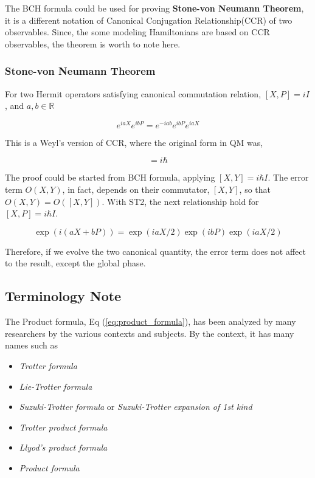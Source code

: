 The BCH formula could be used for proving \textbf{Stone-von Neumann Theorem},
it is a different notation of Canonical Conjugation Relationship(CCR) of two observables.
Since, the some modeling Hamiltonians are based on CCR observables,
the theorem is worth to note here.

\subsubsection{Stone-von Neumann Theorem}

\begin{theorem}  %
    For two Hermit operators satisfying canonical commutation relation, 
    $[X, P] = i I$,
    and $a, b \in \mathbb{R}$
    
    \begin{equation}
        e^{i a X} e^{i b P} = e^{- i ab} e^{i bP} e^{iaX}
    \end{equation}
\end{theorem}

This is a Weyl's version of CCR, where the original form in QM was,

\begin{equation}
    [x, p] = i \hbar
\end{equation}

The proof could be started from BCH formula, applying $[X, Y] = i \hbar I$.
The error term $O(X, Y)$, in fact, depends on their commutator, $[X, Y]$, 
so that $O(X, Y) = O([X, Y])$\cite{PhysRevX.11.011020}. 
With ST2, the next relationship hold for $[X, P] = i\hbar I$.

\begin{equation}
    \exp(i (a X + b P)) = \exp(i a X/2) \exp(i b P) \exp(i a X/2)
\end{equation}

Therefore, if we evolve the two canonical quantity,
the error term does not affect to the result, except the global phase.

\subsection{Terminology Note}

The Product formula, Eq (\ref{eq:product_formula}), has been analyzed by many researchers by the various contexts and subjects.
By the context, it has many names such as

\begin{itemize}
    \item \textit{Trotter formula}
    \item \textit{Lie-Trotter formula}
    \item \textit{Suzuki-Trotter formula} or \textit{Suzuki-Trotter expansion of 1st kind}  
    \item \textit{Trotter product formula}
    \item \textit{Llyod's product formula}
    \item \textit{Product formula}
\end{itemize}


